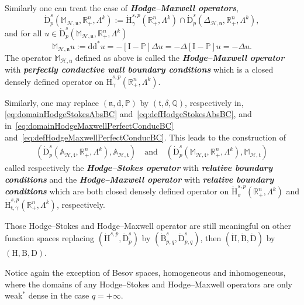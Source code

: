 \documentclass[10pt]{amsart}
\theoremstyle{definition}\newtheorem{defi}[theo]{Definition}\newtheorem{rema}[theo]{Remark}\newtheorem{exam}[theo]{Example}\newtheorem{exem}[theo]{Example}\newtheorem{nota}[theo]{Notation}
\newcommand{\bbP}{\mathbb{P}}
\newcommand{\bbA}{\mathbb{A}}
\newcommand{\bbR}{\mathbb{R}}
\newcommand{\bbM}{\mathbb{M}}
\newcommand{\bbQ}{\mathbb{Q}}
\newcommand{\rmH}{\mathrm{H}}%
\newcommand{\rmB}{\mathrm{B}}
\newcommand{\rmd}{\mathrm{d}}
\newcommand{\rmD}{\mathrm{D}}
\newcommand{\rmI}{\mathrm{I}}
\newcommand{\clH}{\mathcal{H}}
\newcommand{\fkn}{\mathfrak{n}}
\newcommand{\fkt}{\mathfrak{t}}
\begin{document}
Similarly one can treat the case of \textbf{\emph{Hodge--Maxwell operators}},
\begin{equation}\label{eq:domainHodgeMaxwellPerfectConducBC}
\dot{\rmD}^{s}_{p}\left(\bbM_{\clH,\fkn},\bbR^n_+,\Lambda^k\right):= \dot{\rmH}^{s,p}_{\gamma}\left(\bbR^n_+,\Lambda^k\right)\cap\dot{\rmD}^{s}_{p}\left(\Delta_{\clH,\fkn},\bbR^n_+,\Lambda^k\right),
\end{equation}
and for all $u\in \dot{\rmD}^{s}_{p}(\bbM_{\clH,\fkn},\bbR^n_+,\Lambda^k)$
\begin{equation}\label{eq:defHodgeMaxwellPerfectConducBC}
\bbM_{\clH,\fkn} u:= \rmd\rmd^\ast u = -[\rmI -\bbP]\Delta u = -\Delta [\rmI -\bbP] u =-\Delta u .
\end{equation}
The operator $\bbM_{\clH,\fkn}$ defined as above is called the \textbf{\emph{Hodge--Maxwell operator}} with \textbf{\emph{perfectly conductive wall boundary conditions}} which is a closed densely defined operator on $\dot{\rmH}^{s,p}_{\gamma}(\bbR^n_+,\Lambda^k)$.

Similarly, one may replace $(\fkn,\rmd,\bbP)$ by $(\fkt,\delta,\bbQ)$, respectively in, \eqref{eq:domainHodgeStokesAbsBC} and~\eqref{eq:defHodgeStokesAbsBC}, and in~\eqref{eq:domainHodgeMaxwellPerfectConducBC} and~\eqref{eq:defHodgeMaxwellPerfectConducBC}. This leads to the construction of
\begin{align}
\left(\dot{\rmD}^{s}_{p}\left(\bbA_{\clH,\fkt},\bbR^n_+,\Lambda^k\right), \bbA_{\clH,\fkt}\right)\quad \text{and}\quad\left(\dot{\rmD}^{s}_{p}\left(\bbM_{\clH,\fkt},\bbR^n_+,\Lambda^k\right), \bbM_{\clH,\fkt}\right)
\end{align}
called respectively the \textbf{\emph{Hodge--Stokes operator}} with \textbf{\emph{relative boundary conditions}} and the \textbf{\emph{Hodge--Maxwell operator}} with \textbf{\emph{relative boundary conditions}} which are both closed densely defined operator on $\dot{\rmH}^{s,p}_{\sigma}(\bbR^n_+,\Lambda^k)$ and $\dot{\rmH}^{s,p}_{\fkt,\gamma}(\bbR^n_+,\Lambda^k)$, respectively.

Those Hodge--Stokes and Hodge--Maxwell operator are still meaningful on other function spaces replacing $(\dot{\rmH}^{s,p},\dot{\rmD}^{s}_{p})$ by $(\dot{\rmB}^{s}_{p,q},\dot{\rmD}^{s}_{p,q})$, then $(\dot{\rmH},\dot{\rmB},\dot{\rmD})$ by $({\rmH},{\rmB},{\rmD})$.

Notice again the exception of Besov spaces, homogeneous and inhomogeneous, where the domains of any Hodge--Stokes and Hodge--Maxwell operators are only weak${}^\ast$ dense in the case $q=+\infty$.
\end{document}
